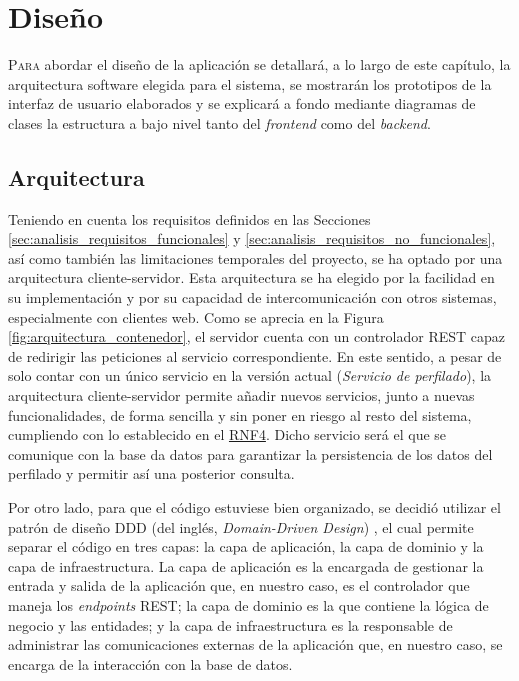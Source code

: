 \chapter{Diseño}
\label{chap:diseño}

\lettrine{P}{ara} abordar el diseño de la aplicación se detallará, a lo largo de este capítulo, la arquitectura software elegida para el sistema,
se mostrarán los prototipos de la interfaz de usuario elaborados y se explicará a fondo mediante diagramas de clases la estructura a bajo nivel
tanto del \textit{frontend} como del \textit{backend}.

\section{Arquitectura}
\label{sec:diseño_arquitectura}

Teniendo en cuenta los requisitos definidos en las Secciones \ref{sec:analisis_requisitos_funcionales} y \ref{sec:analisis_requisitos_no_funcionales},
así como también las limitaciones temporales del proyecto, se ha optado por una arquitectura cliente-servidor. Esta arquitectura se ha elegido
por la facilidad en su implementación y por su capacidad de intercomunicación con otros sistemas, especialmente con clientes web. Como
se aprecia en la Figura \ref{fig:arquitectura_contenedor}, el servidor cuenta con un controlador REST capaz de redirigir las peticiones al servicio
correspondiente. En este sentido, a pesar de solo contar con un único servicio en la versión actual (\textit{Servicio de perfilado}),
la arquitectura cliente-servidor permite añadir nuevos servicios, junto a nuevas funcionalidades, de forma sencilla y sin poner en riesgo al resto del sistema,
cumpliendo con lo establecido en el \hyperref[req:rnf4]{RNF4}.
Dicho servicio será el que se comunique con la base da datos para garantizar la persistencia de los datos del perfilado y permitir así
una posterior consulta.

\bigskip
Por otro lado, para que el código estuviese bien organizado, se decidió utilizar el patrón de diseño DDD (del inglés, \textit{Domain-Driven Design}) \cite{ddd}, el cual
permite separar el código en tres capas: la capa de aplicación, la capa de dominio y la capa de infraestructura. La capa de aplicación es la encargada de gestionar
la entrada y salida de la aplicación que, en nuestro caso, es el controlador que maneja los \textit{endpoints} REST; la capa de dominio es la que contiene la lógica
de negocio y las entidades; y la capa de infraestructura es la responsable de administrar las comunicaciones externas de la aplicación que, en nuestro
caso, se encarga de la interacción con la base de datos.

